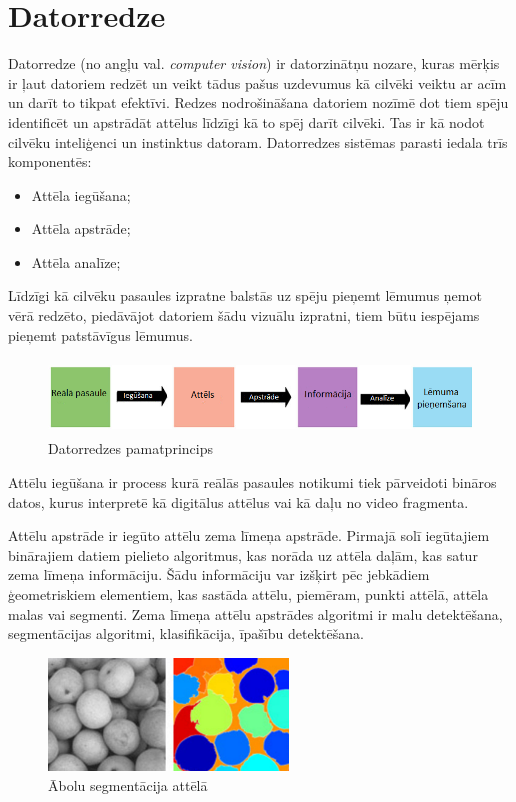 \newpage
\section{Datorredze}
Datorredze (no angļu val. \textit{computer vision}) ir datorzinātņu nozare, kuras mērķis ir ļaut datoriem redzēt un veikt tādus pašus uzdevumus kā cilvēki veiktu ar acīm un darīt to tikpat efektīvi. Redzes nodrošināšana datoriem nozīmē dot tiem spēju identificēt un apstrādāt attēlus līdzīgi kā to spēj darīt cilvēki. Tas ir kā nodot cilvēku inteliģenci un instinktus datoram. Datorredzes sistēmas parasti iedala trīs komponentēs:
\begin{itemize}
	\item Attēla iegūšana;
	\item Attēla apstrāde;
	\item Attēla analīze;
\end{itemize}
Līdzīgi kā cilvēku pasaules izpratne balstās uz spēju pieņemt lēmumus ņemot vērā redzēto, piedāvājot datoriem šādu vizuālu izpratni, tiem būtu iespējams pieņemt patstāvīgus lēmumus.

\begin{figure}[h]%
	\centering
	\includegraphics[height=2cm]{images/computervision1.png} %
	\caption{Datorredzes pamatprincips}%
	\label{fig:example}%
\end{figure}

Attēlu iegūšana ir process kurā reālās pasaules notikumi tiek pārveidoti bināros datos, kurus interpretē kā digitālus attēlus vai kā daļu no video fragmenta. 

Attēlu apstrāde ir iegūto attēlu zema līmeņa apstrāde. Pirmajā solī iegūtajiem binārajiem datiem pielieto algoritmus, kas norāda uz attēla daļām, kas satur zema līmeņa informāciju. Šādu informāciju var izšķirt pēc jebkādiem ģeometriskiem elementiem, kas sastāda attēlu, piemēram, punkti attēlā, attēla malas vai segmenti. Zema līmeņa attēlu apstrādes algoritmi ir malu detektēšana, segmentācijas algoritmi, klasifikācija, īpašību detektēšana.
\begin{figure}[h]%
	\centering
	\includegraphics[height=3cm]{images/computervision2.png} %
	\caption{Ābolu segmentācija attēlā \cite{compv1}}%
	\label{fig:example}%
\end{figure} 

